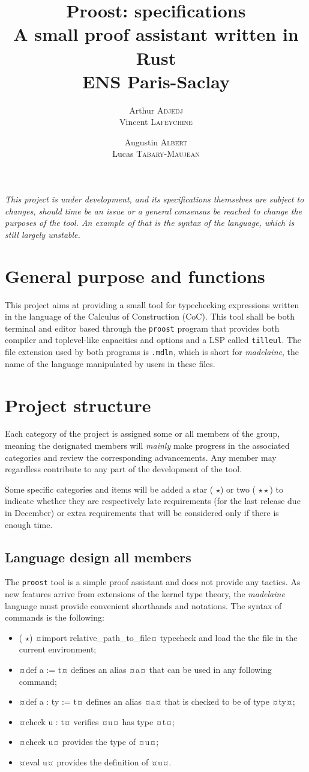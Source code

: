 \documentclass[twocolumn]{article}
\author{
  Arthur \textsc{Adjedj}\\
  Vincent \textsc{Lafeychine} \and
  Augustin \textsc{Albert} \\
  Lucas \textsc{Tabary-Maujean}
}
\title{\textbf{Proost: specifications}\\
  \large A small proof assistant written in Rust
  \\[1\baselineskip]\normalsize ENS Paris-Saclay
}
\newcommand{\members}[1]{\texorpdfstring{\hfill\scriptsize #1}{}}
\newcommand{\etun}{({\color{Green} $\star$}) }
\newcommand{\etde}{({\color{Orange} $\star\star$}) }
\begin{document}
\thispagestyle{fancy}
\maketitle

\emph{
  This project is under development, and its specifications themselves are
  subject to changes, should time be an issue or a general consensus be reached
  to change the purposes of the tool. An example of that is the syntax of
  the language, which is still largely unstable.
}

\section{General purpose and functions}
This project aims at providing a small tool for typechecking expressions written in
the language of the Calculus of Construction (CoC). This tool shall be
both terminal and editor based through the \texttt{proost} program that provides both compiler and toplevel-like capacities and options and a LSP called \texttt{tilleul}.
The file extension used by both programs is \texttt{.mdln}, which is short for \emph{madelaine}, the name of the language manipulated by users in these files.


\section{Project structure}
Each category of the project is assigned some or all members of the group,
meaning the designated members will \emph{mainly} make progress in the associated categories
and review the corresponding advancements. Any member may regardless contribute to any part
of the development of the tool.

Some specific categories and items will be added a star \etun or two \etde to
indicate whether they are respectively late requirements (for the last release
due in December)
or extra requirements that will be considered only if there is enough time.

\subsection{Language design \members{all members}}
The \texttt{proost} tool is a simple proof assistant and does not provide any
tactics. As new features arrive from extensions of the kernel type theory, the
\emph{madelaine} language must provide convenient shorthands and notations. The syntax of commands is the following:
\begin{itemize}
  \item \etun¤import relative_path_to_file¤ typecheck and load the the file in the current environment;
  \item ¤def a := t¤ defines an alias ¤a¤ that can be used in any following command;
  \item ¤def a : ty := t¤ defines an alias ¤a¤ that is checked to be of type ¤ty¤;
  \item ¤check u : t¤ verifies ¤u¤ has type ¤t¤;
  \item ¤check u¤ provides the type of ¤u¤;
  \item ¤eval u¤ provides the definition of ¤u¤.
\end{itemize}
\end{document}
